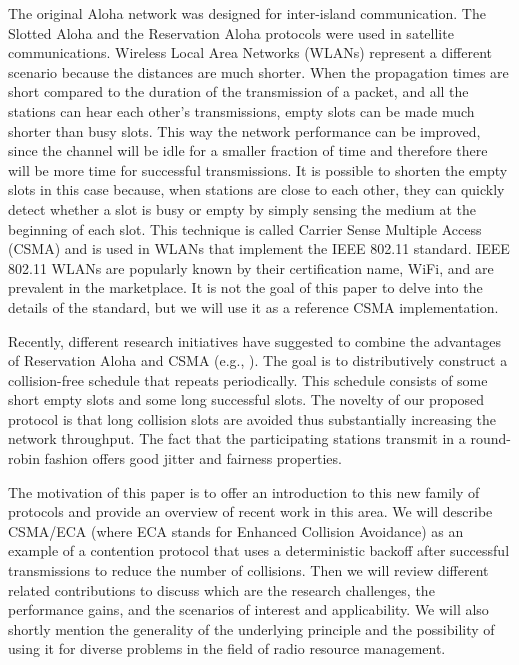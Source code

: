 \documentclass[journal]{IEEEtran}
\begin{document}
The original Aloha network was designed for inter-island communication.
The Slotted Aloha and the Reservation Aloha protocols were used in satellite communications.
Wireless Local Area Networks (WLANs) represent a different scenario because the distances are much shorter.
When the propagation times are short compared to the duration of the transmission of a packet, and all the stations can hear each other's transmissions, empty slots can be made much shorter than busy slots.
This way the network performance can be improved, since the channel will be idle for a smaller fraction of time and therefore there will be more time for successful transmissions.
It is possible to shorten the empty slots in this case because, when stations are close to each other, they can quickly detect whether a slot is busy or empty by simply sensing the medium at the beginning of each slot.
This technique is called Carrier Sense Multiple Access (CSMA) and is used in WLANs that implement the IEEE 802.11 standard.
IEEE 802.11 WLANs are popularly known by their certification name, WiFi, and are prevalent in the marketplace.
It is not the goal of this paper to delve into the details of the standard, but we will use it as a reference CSMA implementation.

Recently, different research initiatives have suggested to combine the advantages of Reservation Aloha and CSMA (e.g., \cite{barcelo2008lba,he2009srb,barcelo2010fcc,fang2011dlm,barcelo2011tcf,martorell2012pec}). 
The goal is to distributively construct a collision-free schedule that repeats periodically.
This schedule consists of some short empty slots and some long successful slots.
The novelty of our proposed protocol is that long collision slots are avoided thus substantially increasing the network throughput.
The fact that the participating stations transmit in a round-robin fashion offers good jitter and fairness properties.

The motivation of this paper is to offer an introduction to this new family of protocols and provide an overview of recent work in this area.
We will describe CSMA/ECA (where ECA stands for Enhanced Collision Avoidance) as an example of a contention protocol that uses a deterministic backoff after successful transmissions to reduce the number of collisions.
Then we will review different related contributions to discuss  which are the research challenges, the performance gains, and the scenarios of interest and applicability.
We will also shortly mention the generality of the underlying principle and the possibility of using it for diverse problems in the field of radio resource management.
\end{document}
